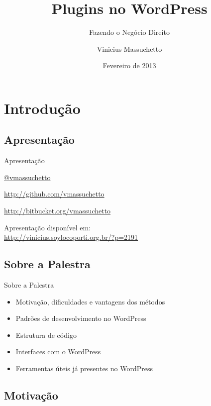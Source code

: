 \documentclass{beamer}
\title{Plugins no WordPress}
\subtitle{Fazendo o Negócio Direito}
\author{Vinicius Massuchetto}
\institute{Campus Party Brasil 2013}
\date{Fevereiro de 2013}
\begin{document}
\frame{\titlepage}

\section{Introdução}

\subsection{Apresentação}

\begin{frame}{Apresentação}
  \begin{center}
    \url{@vmassuchetto}

    \url{http://github.com/vmassuchetto}

    \url{http://bitbucket.org/vmassuchetto}

    Apresentação disponível em: \\
    \url{http://vinicius.soylocoporti.org.br/?p=2191}
  \end{center}
\end{frame}

\subsection{Sobre a Palestra}

\begin{frame}{Sobre a Palestra}
\begin{itemize}
  \pause \item Motivação, dificuldades e vantagens dos métodos
  \pause \item Padrões de desenvolvimento no WordPress
  \pause \item Estrutura de código
  \pause \item Interfaces com o WordPress
  \pause \item Ferramentas úteis já presentes no WordPress
\end{itemize}
\end{frame}

\subsection{Motivação}
\end{document}

